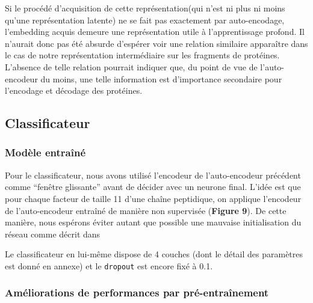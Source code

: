 \documentclass[a4paper, 11pt, onecolumn]{article}
\begin{document}
Si le procédé d'acquisition de cette
\og représentation\fg (qui n'est ni plus ni moins qu'une représentation latente) ne
se fait pas exactement par auto-encodage, l'embedding acquis demeure une
représentation utile à l'apprentissage profond.  Il n'aurait donc pas été
absurde d'espérer voir une relation similaire apparaître dans le cas de notre
représentation intermédiaire sur les fragments de protéines. L'absence de telle
relation pourrait indiquer que, du point de vue de l'auto-encodeur du moins, une
telle information est d'importance secondaire pour l'encodage et décodage des protéines.

\subsection{Classificateur}

\subsubsection{Modèle entraîné}

Pour le classificateur, nous avons
utilisé l'encodeur de l'auto-encodeur précédent comme ``fenêtre glissante''
avant de décider avec un neurone final. L'idée est que pour chaque facteur de
taille 11 d'une chaîne peptidique, on applique l'encodeur de l'auto-encodeur
entraîné de manière non supervisée (\textbf{Figure 9}). De cette manière, nous espérons éviter
autant que possible une mauvaise initialisation du réseau comme décrit dans \cite{vincent2010stacked}

Le classificateur en lui-même dispose de 4 couches (dont le détail des
paramètres est donné en annexe) et le \texttt{dropout} est encore fixé à 0.1.

\subsubsection{Améliorations de performances par pré-entraînement}
\end{document}
